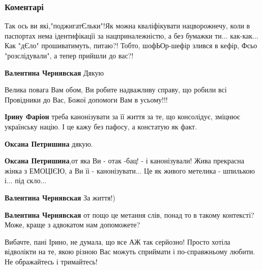  
 
 
 
 
\subsubsection{Коментарі}
\label{sec:02_11_2021.fb.farion_iryna.1.vata_obostrenie.cmt}

\begin{itemize} %

Так ось ви які,"поджигатЄльки"!Як можна кваліфікувати нацворожнечу, коли в
паспортах нема ідентифікацїі за нацприналежністю, а без бумажки
ти... как-как... Как "дЄло" прошиватимуть, питаю?! Тобто, шофЬОр-шефір злився в
кефір, Фсьо "розслідували", а тепер прийшли до вас?!


\textbf{Валентина Чернявская} Дякую

Велика повага Вам обом, Ви робите надважливу справу, що робили всі Провідники до Вас, Божої допомоги Вам в усьому!!!

\textbf{Ірину Фаріон} треба канонізувати за її життя за те, що консолідує, зміцнює українську націю. І це кажу без пафосу, а констатую як факт.

\begin{itemize} %
\textbf{Оксана Петришина} дякую.

\textbf{Оксана Петришина},от яка Ви - отак -бац! - і канонізували! Жива прекрасна жінка з ЕМОЦІЄЮ, а Ви їі - канонізувати... Це як живого метелика - шпилькою і... під скло...

\textbf{Валентина Чернявская} За життя!)

\textbf{Валентина Чернявская} от пощо це метання слів, понад то в такому контексті? Може, краще з адвокатом нам допоможете?


Вибачте, пані Ірино, не думала, що все АЖ так серйозно! Просто хотіла відволікти на
те, якою різною Вас можуть сприймати і по-справжньому любити. Не ображайтесь і
тримайтесь!


\end{itemize}
\end{itemize}
